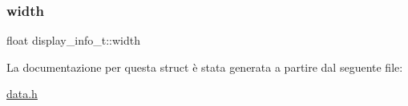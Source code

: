 \mbox{\label{structdisplay__info__t_a3583ae6a4244e807984627a844f6c68e}} 
\subsubsection{\texorpdfstring{width}{width}}
{\footnotesize\ttfamily float display\+\_\+info\+\_\+t\+::width}



La documentazione per questa struct è stata generata a partire dal seguente file\+:\begin{DoxyCompactItemize}
\item 
\hyperlink{data_8h}{data.\+h}\end{DoxyCompactItemize}
